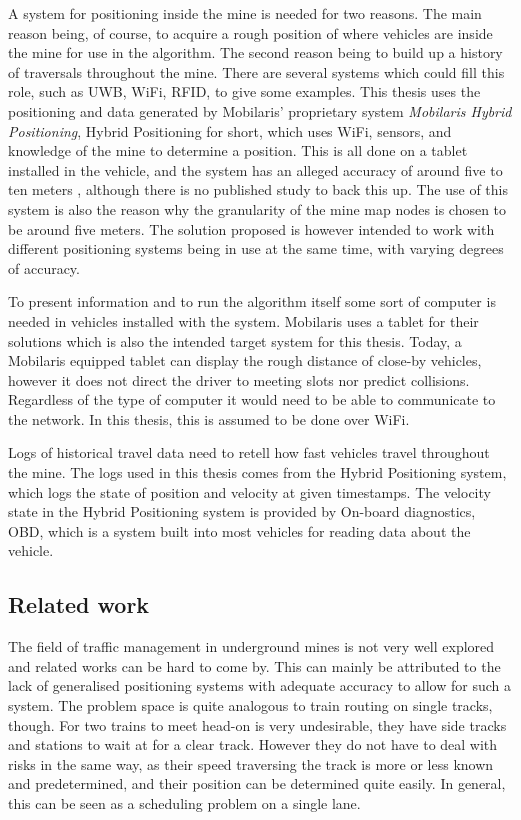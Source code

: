 \documentclass{article}
\begin{document}
			A system for positioning inside the mine is needed for two reasons. The main reason being, of course, to acquire a rough position of where vehicles are inside the mine for use in the algorithm. The second reason being to build up a history of traversals throughout the mine. There are several systems which could fill this role, such as UWB, WiFi, RFID, to give some examples. This thesis uses the positioning and data generated by Mobilaris' proprietary system \textit{Mobilaris Hybrid Positioning\texttrademark}, Hybrid Positioning for short, which uses WiFi, sensors, and knowledge of the mine to determine a position. This is all done on a tablet installed in the vehicle, and the system has an alleged accuracy of around five to ten meters \cite{MobilarisHybridP}, although there is no published study to back this up. The use of this system is also the reason why the granularity of the mine map nodes is chosen to be around five meters. The solution proposed is however intended to work with different positioning systems being in use at the same time, with varying degrees of accuracy.

			To present information and to run the algorithm itself some sort of computer is needed in vehicles installed with the system. Mobilaris uses a tablet for their solutions which is also the intended target system for this thesis. Today, a Mobilaris equipped tablet can display the rough distance of close-by vehicles, however it does not direct the driver to meeting slots nor predict collisions. Regardless of the type of computer it would need to be able to communicate to the network. In this thesis, this is assumed to be done over WiFi.

			Logs of historical travel data need to retell how fast vehicles travel throughout the mine. The logs used in this thesis comes from the Hybrid Positioning system, which logs the state of position and velocity at given timestamps. The velocity state in the Hybrid Positioning system is provided by On-board diagnostics, OBD, \cite{obd} which is a system built into most vehicles for reading data about the vehicle.

    	\subsection{Related work}
			The field of traffic management in underground mines is not very well explored and related works can be hard to come by. This can mainly be attributed to the lack of generalised positioning systems with adequate accuracy to allow for such a system. The problem space is quite analogous to train routing on single tracks, though. For two trains to meet head-on is very undesirable, they have side tracks and stations to wait at for a clear track. However they do not have to deal with risks in the same way, as their speed traversing the track is more or less known and predetermined, and their position can be determined quite easily. In general, this can be seen as a scheduling problem on a single lane.
\end{document}
